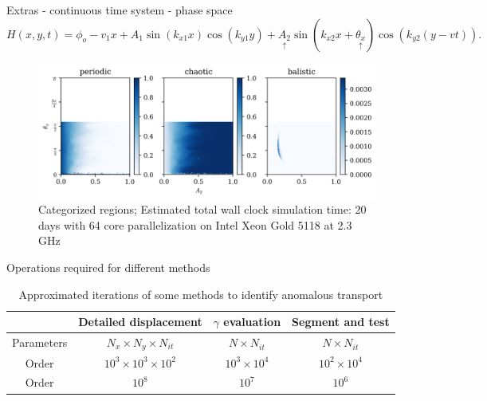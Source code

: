 \documentclass[10pt]{beamer}
\begin{document}
\begin{frame}{Extras - continuous time system - phase space}
    \begin{equation}
        H(x,y,t) = \phi_o - v_1x + A_1 \sin(k_{x1}x)\cos(k_{y1}y) + \underset{\uparrow}{A_2}\sin(k_{x2}x + \underset{\uparrow}{\theta_x})\cos(k_{y2}(y - vt)).
      \end{equation}
    

    \begin{figure}
        \includegraphics[width = \textwidth]{graf_2ondas/paramspace.png}
        \caption{Categorized regions; Estimated total wall clock simulation time: 20 days with 64 core parallelization on Intel Xeon Gold 5118 at 2.3 GHz}
    \end{figure}
\end{frame}

\begin{frame}{Operations required for different methods}
    \begin{table}
        \begin{tabular}{c|c|c|c}
                &  Detailed displacement & $\gamma$ evaluation & Segment and test\\
            \hline
            Parameters & $N_x \times N_y \times N_{it}$ & $N \times N_{it}$ & $N \times N_{it}$\\
            \hline
            Order & $10^{3} \times 10^{3} \times 10^{2}$  & $10^3 \times 10^4$ & $10^2 \times 10^4$\\
            \hline
            Order & $10^{8}$ & $10^{7}$ & $10^6$\\ 
        \end{tabular}
        \caption{Approximated iterations of some methods to identify anomalous transport}
    \end{table}
\end{frame}
    
    
\end{document}
